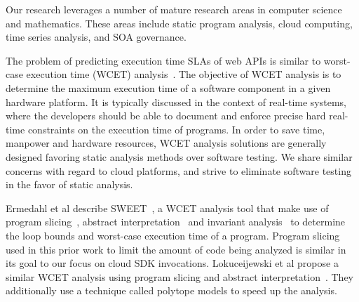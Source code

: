 Our research leverages a number of mature research areas in computer 
science and mathematics. These areas include static program analysis, 
cloud computing, time series analysis,
and SOA governance.

The problem of predicting execution time SLAs of web APIs 
is similar to worst-case execution
time (WCET) analysis~\cite{Wilhelm:2008:WEP:1347375.1347389,ermedahl2007loop,Sandberg:2006:FWF:1134650.1134666,Muchnick:1998:ACD:286076,Frost:2011:WAJ:2043910.2043916}. 
The objective of WCET analysis is to determine the maximum execution time of a software component in a given hardware platform. It is 
typically discussed in the context of real-time systems, where the developers should be able to document
and enforce precise hard real-time constraints on the execution time of programs. In order to save time, 
manpower and hardware resources, WCET analysis solutions are generally designed favoring static
analysis methods over software testing. We share similar concerns with regard to cloud platforms,
and strive to eliminate software testing in the favor of static analysis. 

Ermedahl et al describe SWEET~\cite{ermedahl2007loop}, a WCET analysis tool that make use of program slicing~\cite{Sandberg:2006:FWF:1134650.1134666},
 abstract interpretation~\cite{Cousot:1977:AIU:512950.512973} and invariant analysis~\cite{Muchnick:1998:ACD:286076} to determine the loop bounds and worst-case execution time 
 of a program. 
Program slicing used in this prior work to limit the amount of code being analyzed is similar in its goal to our focus on cloud SDK invocations.
Lokuceijewski et al propose 
 a similar WCET analysis using program slicing and abstract interpretation~\cite{Lokuciejewski:2009:FPS:1545006.1545064}. They additionally use a technique
called polytope models to speed up the analysis.  
 
